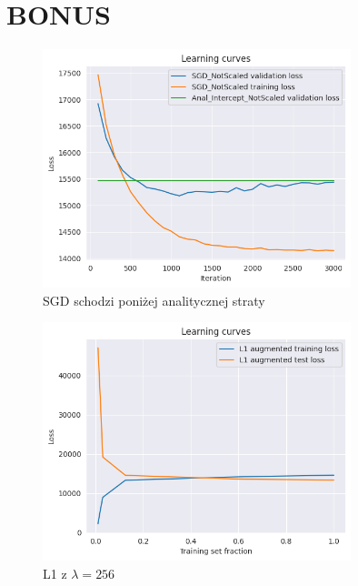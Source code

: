 \documentclass[a4paper,12pt]{article}
\begin{document}
\section{BONUS}
\begin{figure}[h!]
    \centering
    \includegraphics[width=0.8\textwidth]{bonus2.png}
    \caption{SGD schodzi poniżej analitycznej straty}
\end{figure}
\newpage
\begin{figure}[h!]
    \centering
    \includegraphics[width=0.8\textwidth]{bonus1.png}
    \caption{L1 z $\lambda=256$}
\end{figure}



% 
\end{document}
